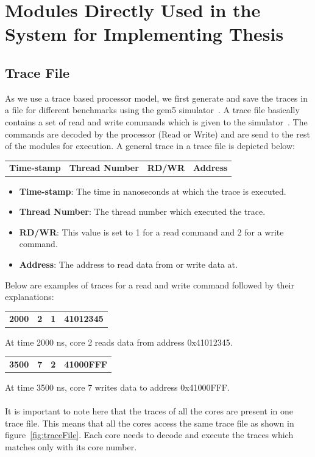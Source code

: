 \documentclass{listhesis}
\begin{document}
\section{Modules Directly Used in the System for Implementing Thesis}
\subsection{Trace File}
As we use a trace based processor model, we first generate and save the traces in a file for different benchmarks using the gem5 simulator~\cite{gem5}. A trace file basically contains a set of read and write commands which is given to the simulator~\cite{akshay}. The commands are decoded by the processor (Read or Write) and are send to the rest of the modules for execution. A general trace in a trace file is depicted below:
\begin{table}[h!]
\begin{center}
 \begin{tabular}{c | c | c | c } 
 \textbf{Time-stamp} &  \textbf{Thread Number}  &  \textbf{RD/WR} &  \textbf{Address} \\ 
\end{tabular}
\end{center}
\end{table}
\begin{itemize}
  \item \textbf{Time-stamp}: The time in nanoseconds at which the trace is executed.
  \item \textbf{Thread Number}: The thread number which executed the trace.
  \item \textbf{RD/WR}: This value is set to 1 for a read command and 2 for a write command. 
  \item \textbf{Address}: The address to read data from or write data at.
\end{itemize}
Below are examples of traces for a read and write command followed by their explanations:
\begin{center}
 \begin{tabular}{c | c | c | c } 
 \textbf{2000} &  \textbf{2}  &  \textbf{1} &  \textbf{41012345} \\ 
\end{tabular}
\end{center}
At time 2000 ns, core 2 reads data from address 0x41012345.
\begin{center}
 \begin{tabular}{c | c | c | c } 
 \textbf{3500} &  \textbf{7}  &  \textbf{2} &  \textbf{41000FFF} \\ 
\end{tabular}
\end{center}
At time 3500 ns, core 7 writes data to address 0x41000FFF.\\
\\
It is important to note here that the traces of all the cores are present in one trace file. This means that all the cores access the same trace file as shown in figure~\ref{fig:traceFile}. Each core needs to decode and execute the traces which matches only with its core number.
\end{document}

